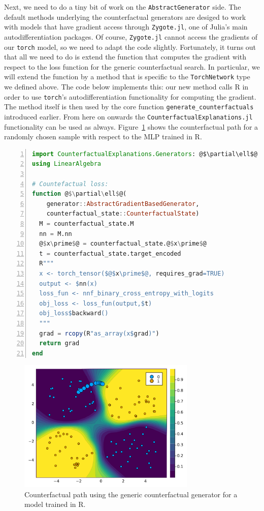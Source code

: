 \documentclass{juliacon}
\begin{document}
Next, we need to do a tiny bit of work on the \texttt{AbstractGenerator}
side. The default methods underlying the counterfactual generators are
desiged to work with models that have gradient access through
\texttt{Zygote.jl}, one of Julia's main autodifferentiation packages. Of
course, \texttt{Zygote.jl} cannot access the gradients of our
\texttt{torch} model, so we need to adapt the code slightly.
Fortunately, it turns out that all we need to do is extend the function
that computes the gradient with respect to the loss function for the
generic counterfactual search. In particular, we will extend the
function by a method that is specific to the \texttt{TorchNetwork} type
we defined above. The code below implements this: our new method calls R
in order to use \texttt{torch}'s autodifferentiation functionality for
computing the gradient. The method itself is then used by the core
function \texttt{generate\_counterfactuals} introduced earlier. From
here on onwards the \texttt{CounterfactualExplanations.jl} functionality
can be used as always. Figure~\ref{fig-torch} shows the counterfactual
path for a randomly chosen sample with respect to the MLP trained in R.

\begin{lstlisting}[language=Julia, escapechar=@, numbers=left]
import CounterfactualExplanations.Generators: @$\partial\ell$@
using LinearAlgebra

# Countefactual loss:
function @$\partial\ell$@(
    generator::AbstractGradientBasedGenerator, 
    counterfactual_state::CounterfactualState) 
  M = counterfactual_state.M
  nn = M.nn
  @$x\prime$@ = counterfactual_state.@$x\prime$@
  t = counterfactual_state.target_encoded
  R"""
  x <- torch_tensor($@$x\prime$@, requires_grad=TRUE)
  output <- $nn(x)
  loss_fun <- nnf_binary_cross_entropy_with_logits
  obj_loss <- loss_fun(output,$t)
  obj_loss$backward()
  """
  grad = rcopy(R"as_array(x$grad)")
  return grad
end
\end{lstlisting}

\begin{figure}

{\centering \includegraphics[width=3.33333in,height=2.5in]{www/ce_torch.png}

}

\caption{\label{fig-torch}Counterfactual path using the generic
counterfactual generator for a model trained in R.}

\end{figure}
\end{document}
